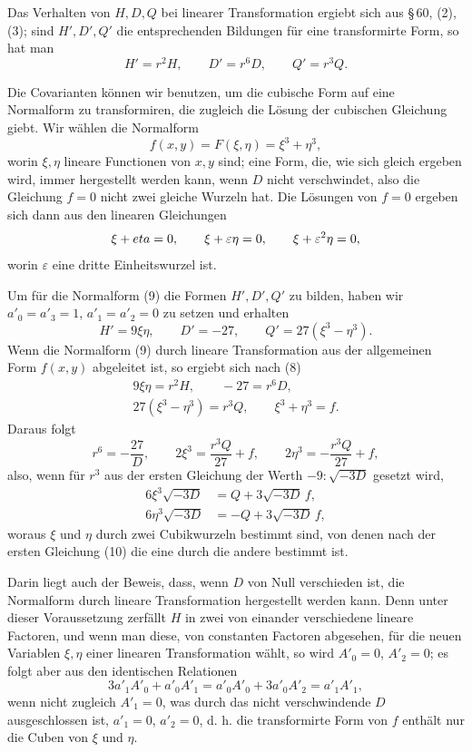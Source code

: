\documentclass[11pt]{article}
\providecommand{\eps}{\varepsilon}
\begin{document}
Das Verhalten von $H,D,Q$ bei linearer Transformation ergiebt sich aus \S\,60, (2), (3); sind $H',D',Q'$ die entsprechenden Bildungen für eine transformirte Form, so hat man
\begin{equation}
 H'=r^2H,
 \qquad
 D'=r^6D,
 \qquad
 Q'=r^3Q.
\tag{8}
\end{equation}

Die Covarianten können wir benutzen, um die cubische Form auf eine Normalform zu transformiren, die zugleich die Lösung der cubischen Gleichung giebt. Wir wählen die Normalform
\begin{equation}
 f(x,y)=F(\xi,\eta)=\xi^3+\eta^3,
\tag{9}
\end{equation}
worin $\xi,\eta$ lineare Functionen von $x,y$ sind; eine Form, die, wie sich gleich ergeben wird, immer hergestellt werden kann, wenn $D$ nicht verschwindet, also die Gleichung $f=0$ nicht zwei gleiche Wurzeln hat. Die Lösungen von $f=0$ ergeben sich dann aus den linearen Gleichungen
\[
 \xi+\\eta=0,
 \qquad
 \xi+\eps\eta=0,
 \qquad
 \xi+\eps^2\eta=0,
\]
worin $\eps$ eine dritte Einheitswurzel ist.

Um für die Normalform (9) die Formen $H',D',Q'$ zu bilden, haben wir $a'_0=a'_3=1$, $a'_1=a'_2=0$ zu setzen und erhalten
\[
 H'=9\xi\eta,
 \qquad
 D'=-27,
 \qquad
 Q'=27(\xi^3-\eta^3).
\]
Wenn die Normalform (9) durch lineare Transformation aus der allgemeinen Form $f(x,y)$ abgeleitet ist, so ergiebt sich nach (8)
\begin{equation}
\begin{gathered}
 9\xi\eta=r^2H,\qquad -27=r^6D,\\
 27(\xi^3-\eta^3)=r^3Q,\qquad \xi^3+\eta^3=f.
\end{gathered}
\tag{10}
\end{equation}
Daraus folgt
\[
 r^6=-\frac{27}{D},
 \qquad
 2\xi^3=\frac{r^3Q}{27}+f,
 \qquad
 2\eta^3=-\frac{r^3Q}{27}+f,
\]
also, wenn für $r^3$ aus der ersten Gleichung der Werth $-9:\sqrt{-3D}$ gesetzt wird,
\begin{equation}
\begin{aligned}
 6\xi^3\sqrt{-3D}&= Q+3\sqrt{-3D}\,f,\\
 6\eta^3\sqrt{-3D}&=-Q+3\sqrt{-3D}\,f,
\end{aligned}
\tag{11}
\end{equation}
woraus $\xi$ und $\eta$ durch zwei Cubikwurzeln bestimmt sind, von denen nach der ersten Gleichung (10) die eine durch die andere bestimmt ist.

Darin liegt auch der Beweis, dass, wenn $D$ von Null verschieden ist, die Normalform durch lineare Transformation hergestellt werden kann. Denn unter dieser Voraussetzung zerfällt $H$ in zwei von einander verschiedene lineare Factoren, und wenn man diese, von constanten Factoren abgesehen, für die neuen Variablen $\xi,\eta$ einer linearen Transformation wählt, so wird $A'_0=0$, $A'_2=0$; es folgt aber aus den identischen Relationen
\[
 3a'_1A'_0+a'_0A'_1=a'_0A'_0+3a'_0A'_2=a'_1A'_1,
\]
wenn nicht zugleich $A'_1=0$, was durch das nicht verschwindende $D$ ausgeschlossen ist, $a'_1=0$, $a'_2=0$, d. h. die transformirte Form von $f$ enthält nur die Cuben von $\xi$ und $\eta$.
\end{document}
